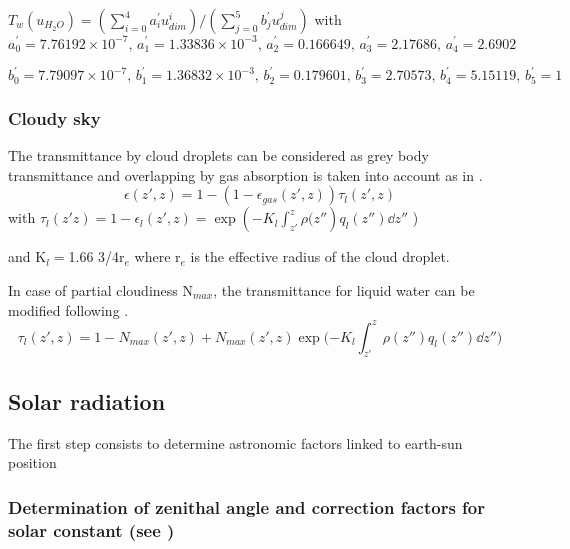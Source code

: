 $T_{w}\left( u_{H_{2}O} \right)=\left( \sum\limits_{i=0}^4
{a_{i}^{'}u_{dim}^{i}} \right)/\left( \sum\limits_{j=0}^5
{b_{j}^{'}u_{dim}^{j}} \right)$
\newline
with
\newline
\begin{equation}
a_{0}^{'}=7.76192\times {10}^{-7},\, a_{1}^{'}=1.33836\times {10}^{-3},\,
a_{2}^{'}=0.166649,\, a_{3}^{'}=2.17686,\, a_{4}^{'}=2.6902\,
\end{equation}

\begin{equation}
b_{0}^{'}=7.79097\times {10}^{-7},\, b_{1}^{'}=1.36832\times {10}^{-3},\,
b_{2}^{'}=0.179601,\, b_{3}^{'}=2.70573,\, b_{4}^{'}=5.15119,\, b_{5}^{'}=1
\end{equation}

\subsubsection{Cloudy sky}
The transmittance by cloud droplets can be considered as grey body
transmittance and overlapping by gas absorption is taken into account as
in \cite{Sasamori:1972}.
\begin{equation}
\epsilon \left( z',z \right)=1-\left( 1-\epsilon_{gas}\left( z',z
\right) \right)\tau_{l}\left( z',z \right)
\end{equation}
with $\tau_{l}(z{'}z)=1-\epsilon
_{l}(z',z)=\exp(-K_{l}\int_{z'}^z
{\rho (z''})q_{l}\left( z''
\right)\dd z'' $ )

and K$_{l}=$1.66 3/4r$_{e}$ where r$_{e}$ is the
effective radius of the cloud droplet.

In case of partial cloudiness N$_{max}$, the transmittance for liquid water
can be modified following \cite{Bougeault:1985}.
\begin{equation}
\tau_{l}\left( z',z \right)=1-N_{max}\left( z',z
\right)+N_{max}(z',z)\exp(-K_{l}\int_{z'}^z {\rho
(z'')q_{l}\left( z'' \right)\dd z'')}
\end{equation}


\subsection{Solar radiation}
The first step consists to determine astronomic factors linked to earth-sun
position

\subsubsection{Determination of zenithal angle and correction factors for solar
constant (see \cite{Paltridge:1974})}

